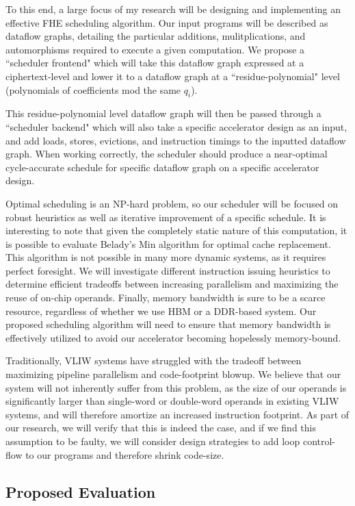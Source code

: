 To this end, a large focus of my research will be designing and implementing
an effective FHE scheduling algorithm. Our input programs will be described
as dataflow graphs, detailing the particular additions, mulitplications,
and automorphisms required to execute a given computation. We propose a
``scheduler frontend" which will take this dataflow graph expressed at a
ciphertext-level and lower it to a dataflow graph at a ``residue-polynomial"
level (polynomials of coefficients mod the same $q_i$).

This residue-polynomial level dataflow graph will then be passed through
a ``scheduler backend" which will also take a specific accelerator design
as an input, and add loads, stores, evictions, and instruction timings to the
inputted dataflow graph. When working correctly, the scheduler should produce
a near-optimal cycle-accurate schedule for specific dataflow graph on a
specific accelerator design.

Optimal scheduling is an NP-hard problem, so our scheduler will be focused
on robust heuristics as well as iterative improvement of a specific schedule.
It is interesting to note that given the completely static nature of this
computation, it is possible to evaluate Belady's Min algorithm for optimal
cache replacement. This algorithm is not possible in many more dynamic systems,
as it requires perfect foresight. We will investigate different instruction 
issuing heuristics to determine
efficient tradeoffs between increasing parallelism and maximizing the 
reuse of on-chip operands. Finally, memory bandwidth is sure to be a scarce
resource, regardless of whether we use HBM or a DDR-based system. Our proposed
scheduling algorithm will need to ensure that memory bandwidth is effectively
utilized to avoid our accelerator becoming hopelessly memory-bound.

Traditionally, VLIW systems have struggled with the tradeoff between maximizing
pipeline parallelism and code-footprint blowup. We believe that our system will
not inherently suffer from this problem, as the size of our operands is
significantly larger than single-word or double-word operands in existing VLIW
systems, and will therefore amortize an increased instruction footprint.
As part of our research, we will verify that this is indeed the case,
and if we find this assumption to be faulty, we will consider design
strategies to add loop control-flow to our programs and therefore
shrink code-size.

\subsection{Proposed Evaluation}


